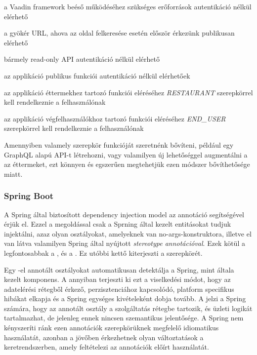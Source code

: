 \begin{listing}
	\item a Vaadin framework beéső működéséhez szükséges erőforrások autentikáció nélkül elérhető
	\item a gyökér URL, ahova az oldal felkeresése esetén először érkezünk publikusan elérhető
	\item bármely read-only API autentikáció nélkül elérhető
	\item az applikáció publikus funkciói autentikáció nélkül elérhetőek
	\item az applikáció éttermekhez tartozó funkciói eléréséhez \emph{RESTAURANT} szerepkörrel kell rendelkeznie a felhasználónak
	\item az applikáció végfelhasználókhoz tartozó funkciói eléréséhez \emph{END\_USER} szerepkörrel kell rendelkeznie a felhasználónak
\end{listing} \par

Amennyiben valamely szerepkör funkcióját szeretnénk bővíteni, például egy GraphQL alapú API-t létrehozni, vagy valamilyen új lehetőséggel augmentálni a az éttermeket, ezt könnyen és egszerűen megtehetjük ezen módszer bővíthetősége miatt. \par

\subsubsection{Spring Boot}

A Spring által biztosított dependency injection model az  annotáció segítségével érjük el. Ezzel a megoldással csak a Sprning által kezelt entitásokat tudjuk injektálni, azaz olyan osztályokat, amelyeknek van no-args-konstruktora, illetve el van látva valamilyen Spring által nyújtott \emph{stereotype annotációval}. Ezek kötül a legfontosabbak a ,  és a . Ez utóbbi kettő kiterjeszti a  szerepkörét. \par

Egy -el annotált osztályokat automatikusan detektálja a Spring, mint általa kezelt komponens. A  annyiban terjeszti ki ezt a viselkedési módot, hogy az adatelérési rétegből érkező, perzisztenciához kapcsolódó, platform specifikus hibákat elkapja és a Spring egységes kivételeként dobja tovább. A  jelzi a Spring számára, hogy az annotált osztály a szolgáltatás rétegbe tartozik, és üzleti logikát tartalmazhat, de jelenleg ennek nincsen szemantikus jelentősége. A Spring nem kényszeríti ránk ezen annotációk szerepkörüknek megfelelő idiomatikus használatát, azonban a jövőben érkezhetnek olyan változtatások a keretrendszerben, amely feltételezi az annotációk előírt használatát. \par
